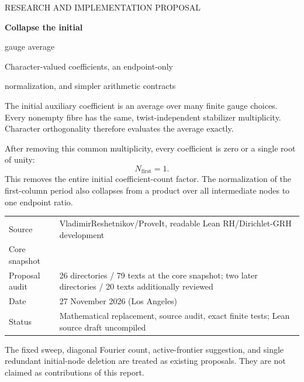

\hypersetup{pageanchor=false}
\begin{titlepage}
\vspace*{10mm}
{\Large\color{accent}RESEARCH AND IMPLEMENTATION PROPOSAL\par}
\vspace{14mm}
{\Huge\bfseries\color{ink}Collapse the initial\par gauge average\par}
\vspace{8mm}
{\Large Character-valued coefficients, an endpoint-only\par normalization, and simpler arithmetic contracts\par}
\vspace{14mm}
\begin{minipage}{.94\linewidth}
\large
The initial auxiliary coefficient is an average over many finite gauge choices. Every nonempty fibre has the same, twist-independent stabilizer multiplicity. Character orthogonality therefore evaluates the average exactly.

After removing this common multiplicity, every coefficient is zero or a single root of unity:
\[
\boxed{\qquad N_{\mathrm{first}}=1.\qquad}
\]
This removes the entire initial coefficient-count factor. The normalization of the first-column period also collapses from a product over all intermediate nodes to one endpoint ratio.
\end{minipage}
\vfill
\begin{tabularx}{\linewidth}{@{}lY@{}}
\toprule
Source & VladimirReshetnikov/ProveIt, readable Lean RH/Dirichlet-GRH development\\
Core snapshot & \\
Proposal audit & 26 directories / 79 texts at the core snapshot; two later directories / 20 texts additionally reviewed\\
Date & 27 November 2026 (Los Angeles)\\
Status & Mathematical replacement, source audit, exact finite tests; Lean source draft uncompiled\\
\bottomrule
\end{tabularx}
\par\vspace{5mm}
\small The fixed sweep, diagonal Fourier count, active-frontier suggestion, and single redundant initial-node deletion are treated as existing proposals. They are not claimed as contributions of this report.
\end{titlepage}
\hypersetup{pageanchor=true}
\begingroup\small\setlength{\parskip}{0pt}\tableofcontents\endgroup
\newpage{}

